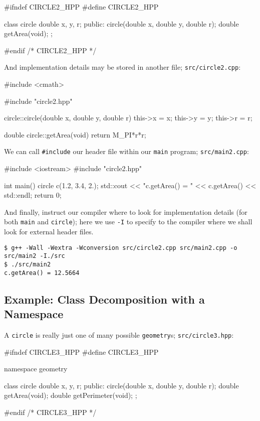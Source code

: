\documentclass[12pt,letterpaper,twoside]{article}
\begin{document}
\begin{cpp}
#ifndef CIRCLE2_HPP
#define CIRCLE2_HPP

class circle {
  double x, y, r;
 public:
  circle(double x, double y, double r);
  double getArea(void);
};

#endif /* CIRCLE2_HPP */
\end{cpp}

And implementation details may be stored in another file;
\texttt{src/circle2.cpp}:

\begin{cpp}
#include <cmath>

#include "circle2.hpp"

circle::circle(double x, double y, double r) {
  this->x = x;
  this->y = y;
  this->r = r;
}

double circle::getArea(void) {
  return M_PI*r*r;
}
\end{cpp}

We can call \texttt{\#include} our header file within our \texttt{main}
program;
\texttt{src/main2.cpp}:

\begin{cpp}
#include <iostream>
#include "circle2.hpp"

int main() {
  circle c(1.2, 3.4, 2.);
  std::cout << "c.getArea() = " << c.getArea() << std::endl;
  return 0;
}
\end{cpp}

And finally, instruct our compiler where to look for implementation details
(for both \texttt{main} and \texttt{circle}); here we use \texttt{-I} to specify
to the compiler where we shall look for external header files.
\begin{verbatim}
$ g++ -Wall -Wextra -Wconversion src/circle2.cpp src/main2.cpp -o src/main2 -I./src
$ ./src/main2
c.getArea() = 12.5664
\end{verbatim}

\subsection{Example: Class Decomposition with a Namespace}

A \texttt{circle} is really just one of many possible \texttt{geometry}s;
\texttt{src/circle3.hpp}:
\begin{cpp}
#ifndef CIRCLE3_HPP
#define CIRCLE3_HPP

namespace geometry {

  class circle {
      double x, y, r;
    public:
      circle(double x, double y, double r);
      double getArea(void);
      double getPerimeter(void); 
  };
}
#endif /* CIRCLE3_HPP */
\end{cpp}
\end{document}
